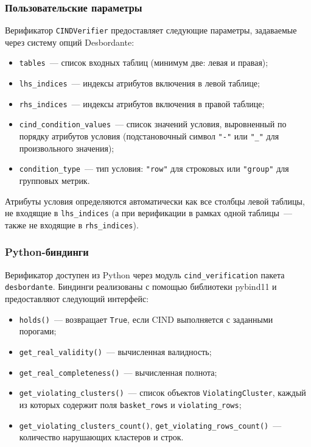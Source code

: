 \subsubsection{Пользовательские параметры}

Верификатор \texttt{CINDVerifier} предоставляет следующие параметры, задаваемые через систему опций Desbordante:

\begin{itemize}
    \item \texttt{tables}~--- список входных таблиц (минимум две: левая и правая);
    \item \texttt{lhs\_indices}~--- индексы атрибутов включения в левой таблице;
    \item \texttt{rhs\_indices}~--- индексы атрибутов включения в правой таблице;
    \item \texttt{cind\_condition\_values}~--- список значений условия, выровненный по порядку атрибутов условия (подстановочный символ \texttt{"-"} или \texttt{"\_"} для произвольного значения);
    \item \texttt{condition\_type}~--- тип условия: \texttt{"row"} для строковых или \texttt{"group"} для групповых метрик.
\end{itemize}

Атрибуты условия определяются автоматически как все столбцы левой таблицы, не входящие в \texttt{lhs\_indices} (а при верификации в рамках одной таблицы~--- также не входящие в \texttt{rhs\_indices}).

\subsubsection{Python-биндинги}

Верификатор доступен из Python через модуль \texttt{cind\_veri\-fi\-ca\-tion} пакета \texttt{desbordante}. Биндинги реализованы с помощью библиотеки pybind11 и предоставляют следующий интерфейс:

\begin{itemize}
    \item \texttt{holds()}~--- возвращает \texttt{True}, если CIND выполняется с заданными порогами;
    \item \texttt{get\_real\_validity()}~--- вычисленная валидность;
    \item \texttt{get\_real\_completeness()}~--- вычисленная полнота;
    \item \texttt{get\_violating\_clusters()}~--- список объектов \texttt{Violating\-Cluster}, каждый из которых содержит поля \texttt{basket\_rows} и \texttt{violating\_rows};
    \item \texttt{get\_violating\_clusters\_count()}, \texttt{get\_violating\_rows\_count()}~--- количество нарушающих кластеров и строк.
\end{itemize}

